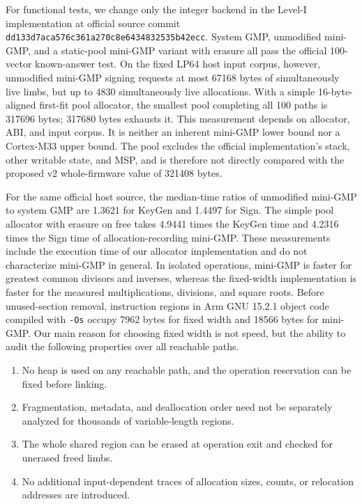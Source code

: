 \documentclass[a4paper,10pt]{article}
\theoremstyle{definition}
\theoremstyle{remark}
\begin{document}
For functional tests, we change only the integer backend in the Level-I implementation at official source commit \texttt{dd133d7aca576c361a270c8e6434832535b42ecc}. System GMP, unmodified mini-GMP, and a static-pool mini-GMP variant with erasure all pass the official 100-vector known-answer test. On the fixed LP64 host input corpus, however, unmodified mini-GMP signing requests at most \num{67168} bytes of simultaneously live limbs, but up to \num{4830} simultaneously live allocations. With a simple 16-byte-aligned first-fit pool allocator, the smallest pool completing all 100 paths is \num{317696} bytes; \num{317680} bytes exhausts it. This measurement depends on allocator, ABI, and input corpus. It is neither an inherent mini-GMP lower bound nor a Cortex-M33 upper bound. The pool excludes the official implementation's stack, other writable state, and MSP, and is therefore not directly compared with the proposed v2 whole-firmware value of \num{321408} bytes.

For the same official host source, the median-time ratios of unmodified mini-GMP to system GMP are \num{1.3621} for KeyGen and \num{1.4497} for Sign. The simple pool allocator with erasure on free takes \num{4.9441} times the KeyGen time and \num{4.2316} times the Sign time of allocation-recording mini-GMP. These measurements include the execution time of our allocator implementation and do not characterize mini-GMP in general. In isolated operations, mini-GMP is faster for greatest common divisors and inverses, whereas the fixed-width implementation is faster for the measured multiplications, divisions, and square roots. Before unused-section removal, instruction regions in Arm GNU 15.2.1 object code compiled with \texttt{-Os} occupy \num{7962} bytes for fixed width and \num{18566} bytes for mini-GMP. Our main reason for choosing fixed width is not speed, but the ability to audit the following properties over all reachable paths.

\begin{enumerate}[leftmargin=2.2em]
  \item No heap is used on any reachable path, and the operation reservation can be fixed before linking.
  \item Fragmentation, metadata, and deallocation order need not be separately analyzed for thousands of variable-length regions.
  \item The whole shared region can be erased at operation exit and checked for unerased freed limbs.
  \item No additional input-dependent traces of allocation sizes, counts, or relocation addresses are introduced.
\end{enumerate}
\end{document}
